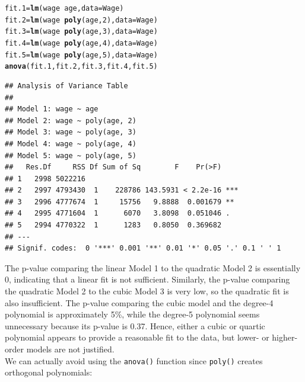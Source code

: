 \documentclass[12pt]{article}\usepackage[]{graphicx}\usepackage[]{color}
\makeatletter
\newcommand{\hlnum}[1]{\textcolor[rgb]{0.686,0.059,0.569}{#1}}%
\newcommand{\hlopt}[1]{\textcolor[rgb]{0,0,0}{#1}}%
\newcommand{\hlstd}[1]{\textcolor[rgb]{0.345,0.345,0.345}{#1}}%
\newcommand{\hlkwb}[1]{\textcolor[rgb]{0.69,0.353,0.396}{#1}}%
\newcommand{\hlkwc}[1]{\textcolor[rgb]{0.333,0.667,0.333}{#1}}%
\newcommand{\hlkwd}[1]{\textcolor[rgb]{0.737,0.353,0.396}{\textbf{#1}}}%
\newenvironment{kframe}{%
 \def\at@end@of@kframe{}%
 \ifinner\ifhmode%
  \def\at@end@of@kframe{\end{minipage}}%
  \begin{minipage}{\columnwidth}%
 \fi\fi%
 \def\FrameCommand##1{\hskip\@totalleftmargin \hskip-\fboxsep
 \colorbox{shadecolor}{##1}\hskip-\fboxsep
     \hskip-\linewidth \hskip-\@totalleftmargin \hskip\columnwidth}%
 \MakeFramed {\advance\hsize-\width
   \@totalleftmargin\z@ \linewidth\hsize
   \@setminipage}}%
 {\par\unskip\endMakeFramed%
 \at@end@of@kframe}
\newenvironment{knitrout}{}{} %
\makeatother
\begin{document}
\begin{knitrout}
\color{fgcolor}\begin{kframe}
\begin{alltt}
\hlstd{fit.1} \hlkwb{=} \hlkwd{lm}\hlstd{(wage}\hlopt{~}\hlstd{age,} \hlkwc{data}\hlstd{=Wage)}
\hlstd{fit.2} \hlkwb{=} \hlkwd{lm}\hlstd{(wage}\hlopt{~}\hlkwd{poly}\hlstd{(age,}\hlnum{2}\hlstd{),} \hlkwc{data}\hlstd{=Wage)}
\hlstd{fit.3} \hlkwb{=} \hlkwd{lm}\hlstd{(wage}\hlopt{~}\hlkwd{poly}\hlstd{(age,}\hlnum{3}\hlstd{),} \hlkwc{data}\hlstd{=Wage)}
\hlstd{fit.4} \hlkwb{=} \hlkwd{lm}\hlstd{(wage}\hlopt{~}\hlkwd{poly}\hlstd{(age,}\hlnum{4}\hlstd{),} \hlkwc{data}\hlstd{=Wage)}
\hlstd{fit.5} \hlkwb{=} \hlkwd{lm}\hlstd{(wage}\hlopt{~}\hlkwd{poly}\hlstd{(age,}\hlnum{5}\hlstd{),} \hlkwc{data}\hlstd{=Wage)}
\hlkwd{anova}\hlstd{(fit.1, fit.2, fit.3, fit.4, fit.5)}
\end{alltt}
\begin{verbatim}
## Analysis of Variance Table
## 
## Model 1: wage ~ age
## Model 2: wage ~ poly(age, 2)
## Model 3: wage ~ poly(age, 3)
## Model 4: wage ~ poly(age, 4)
## Model 5: wage ~ poly(age, 5)
##   Res.Df     RSS Df Sum of Sq        F    Pr(>F)    
## 1   2998 5022216                                    
## 2   2997 4793430  1    228786 143.5931 < 2.2e-16 ***
## 3   2996 4777674  1     15756   9.8888  0.001679 ** 
## 4   2995 4771604  1      6070   3.8098  0.051046 .  
## 5   2994 4770322  1      1283   0.8050  0.369682    
## ---
## Signif. codes:  0 '***' 0.001 '**' 0.01 '*' 0.05 '.' 0.1 ' ' 1
\end{verbatim}
\end{kframe}
\end{knitrout}

The p-value comparing the linear Model 1 to the quadratic Model 2 is essentially 0, indicating that a linear fit is not sufficient. Similarly, the p-value comparing the quadratic Model 2 to the cubic Model 3 is very low, so the quadratic fit is also insufficient. The p-value comparing the cubic model and the degree-4 polynomial is approximately 5\%, while the degree-5 polynomial seems unnecessary because its p-value is 0.37. Hence, either a cubic or quartic polynomial appears to provide a reasonable fit to the data, but lower- or higher-order models are not justified.\\

We can actually avoid using the \texttt{anova()} function since \texttt{poly()} creates orthogonal polynomials:
\end{document}
